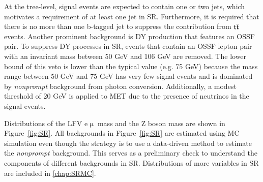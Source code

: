 At the tree-level, signal events are expected to contain one or two jets, which motivates a requirement of at least one jet in \ac{SR}. Furthermore, it is required that there is no more than one b-tagged jet to suppress the contribution from $\textsf{t}\overline{\textsf{t}}$ events. Another prominent background is \ac{DY} production that features an \ac{OSSF} pair. To suppress \ac{DY} processes in \ac{SR}, events that contain an \ac{OSSF} lepton pair with an invariant mass between 50 GeV and 106 GeV are removed. The lower bound of this veto is lower than the typical value (e.g. 75 GeV) because the mass range between 50 GeV and 75 GeV has very few signal events and is dominated by \emph{nonprompt} background from photon conversion. Additionally, a modest threshold of 20 GeV is applied to \ac{MET} due to the presence of neutrinos in the signal events.

Distributions of the LFV e$\upmu$ mass and the Z boson mass are shown in Figure~\ref{fig:SR}. All backgrounds in Figure~\ref{fig:SR} are estimated using \ac{MC} simulation even though the strategy is to use a data-driven method to estimate the \emph{nonprompt} background. This serves as a preliminary check to understand the components of different backgrounds in \ac{SR}. Distributions of more variables in \ac{SR} are included in \autoref{chap:SRMC}.

